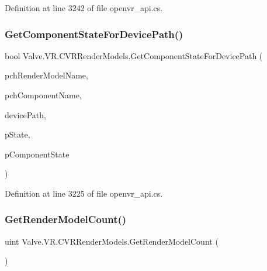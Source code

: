 Definition at line 3242 of file openvr\+\_\+api.\+cs.

\mbox{\label{class_valve_1_1_v_r_1_1_c_v_r_render_models_ad8b4389985fb3dad9cfb1c4525f25ad5}} 
\subsubsection{\texorpdfstring{GetComponentStateForDevicePath()}{GetComponentStateForDevicePath()}}
{\footnotesize\ttfamily bool Valve.\+V\+R.\+C\+V\+R\+Render\+Models.\+Get\+Component\+State\+For\+Device\+Path (\begin{DoxyParamCaption}\item[{string}]{pch\+Render\+Model\+Name,  }\item[{string}]{pch\+Component\+Name,  }\item[{ulong}]{device\+Path,  }\item[{ref \mbox{\hyperlink{struct_valve_1_1_v_r_1_1_render_model___controller_mode___state__t}{Render\+Model\+\_\+\+Controller\+Mode\+\_\+\+State\+\_\+t}}}]{p\+State,  }\item[{ref \mbox{\hyperlink{struct_valve_1_1_v_r_1_1_render_model___component_state__t}{Render\+Model\+\_\+\+Component\+State\+\_\+t}}}]{p\+Component\+State }\end{DoxyParamCaption})}



Definition at line 3225 of file openvr\+\_\+api.\+cs.

\mbox{\label{class_valve_1_1_v_r_1_1_c_v_r_render_models_ae327ea4ed3891f4dc5dfadc349d099ac}} 
\subsubsection{\texorpdfstring{GetRenderModelCount()}{GetRenderModelCount()}}
{\footnotesize\ttfamily uint Valve.\+V\+R.\+C\+V\+R\+Render\+Models.\+Get\+Render\+Model\+Count (\begin{DoxyParamCaption}{ }\end{DoxyParamCaption})}




